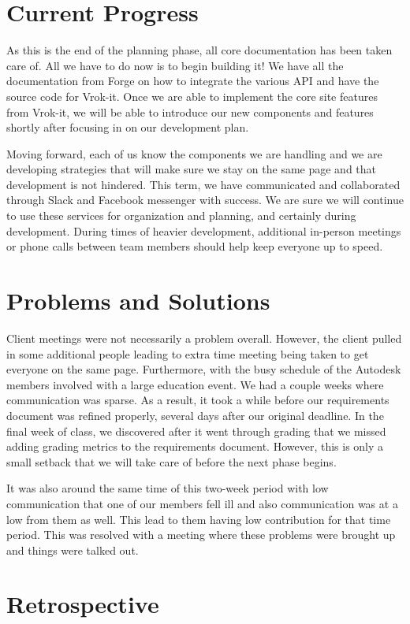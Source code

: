 \documentclass[10pt,draftclsnofoot,onecolumn]{IEEEtran}
\begin{document}
\section{Current Progress}
As this is the end of the planning phase, all core documentation has been taken care of. All we have to do now is to begin building it! We have all the documentation from Forge on how to integrate the various API and have the source code for Vrok-it. Once we are able to implement the core site features from Vrok-it, we will be able to introduce our new components and features shortly after focusing in on our development plan.

Moving forward, each of us know the components we are handling and we are developing strategies that will make sure we stay on the same page and that development is not hindered. This term, we have communicated and collaborated through Slack and Facebook messenger with success. We are sure we will continue to use these services for organization and planning, and certainly during development. During times of heavier development, additional in-person meetings or phone calls between team members should help keep everyone up to speed.


\section{Problems and Solutions}
Client meetings were not necessarily a problem overall. However, the client pulled in some additional people leading to extra time meeting being taken to get everyone on the same page. Furthermore, with the busy schedule of the Autodesk members involved with a large education event. We had a couple weeks where communication was sparse. As a result, it took a while before our requirements document was refined properly, several days after our original deadline. In the final week of class, we discovered after it went through grading that we missed adding grading metrics to the requirements document. However, this is only a small setback that we will take care of before the next phase begins. 


It was also around the same time of this two-week period with low communication that one of our members fell ill and also communication was at a low from them as well. This lead to them having low contribution for that time period. This was resolved with a meeting where these problems were brought up and things were talked out.

\section{Retrospective}
\end{document}
